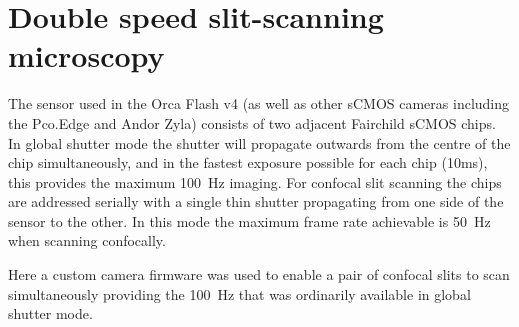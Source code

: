 



\section{Double speed slit-scanning microscopy}

The sensor used in the Orca Flash v4 (as well as other sCMOS cameras including the Pco.Edge and Andor Zyla) consists of two adjacent Fairchild sCMOS chips.
In global shutter mode the shutter will propagate outwards from the centre of the chip simultaneously, and in the fastest exposure possible for each chip (10ms), this provides the maximum \SI{100}{\hertz} imaging.
For confocal slit scanning the chips are addressed serially with a single thin shutter propagating from one side of the sensor to the other.
In this mode the maximum frame rate achievable is \SI{50}{\hertz} when scanning confocally.

Here a custom camera firmware was used to enable a pair of confocal slits to scan simultaneously providing the \SI{100}{\hertz} that was ordinarily available in global shutter mode.

